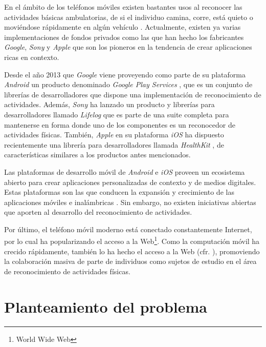 En el ámbito de los teléfonos móviles existen bastantes usos al reconocer
las actividades básicas ambulatorias, de si el individuo camina, corre,
está quieto o moviéndose rápidamente en algún vehículo \cite{campuzano2015}
\cite{googlio2013}. Actualmente, existen ya varias implementaciones
de fondos privados como las que han hecho los fabricantes \emph{Google},
\emph{Sony} y \emph{Apple} que son los pioneros en la tendencia de
crear aplicaciones ricas en contexto.

Desde el año 2013 que \emph{Google} viene proveyendo como parte de
su plataforma \emph{Android} \cite{google2005and}
un producto denominado \emph{Google Play Services} \cite{googl2016loc},
que es un conjunto de librerías de desarrolladores que dispone una
implementación de reconocimiento de actividades. Además, \emph{Sony}
ha lanzado un producto y librerías para desarrolladores llamado \emph{Lifelog}
\cite{sony2016act} que es parte de una suite completa para mantenerse
en forma donde uno de los componentes es un reconocedor de actividades
físicas. También, \emph{Apple} en su plataforma \emph{iOS}
\cite{apple2007ios} ha dispuesto recientemente una librería para
desarrolladores llamada \emph{HealthKit} \cite{healthkit2016}, de
características similares a los productos antes mencionados. 

Las plataformas de desarrollo móvil de \emph{Android} e \emph{iOS
}proveen un ecosistema abierto para crear aplicaciones personalizadas
de contexto y de medios digitales. Estas plataformas son las que conducen
la expansión y crecimiento de las aplicaciones móviles e inalámbricas
\cite{Tanenbaum2010}. Sin embargo, no existen iniciativas abiertas
que aporten al desarrollo del reconocimiento de actividades.

Por último, el teléfono móvil moderno está conectado constantemente
Internet, por lo cual ha popularizando el acceso a la Web\footnote{World Wide Web}.
Como la computación móvil ha crecido rápidamente, también lo ha hecho
el acceso a la Web (cfr. \cite{nyt2008iph}), promoviendo la colaboración
masiva de parte de individuos como sujetos de estudio en el área de
reconocimiento de actividades físicas.

\section{Planteamiento del problema}

